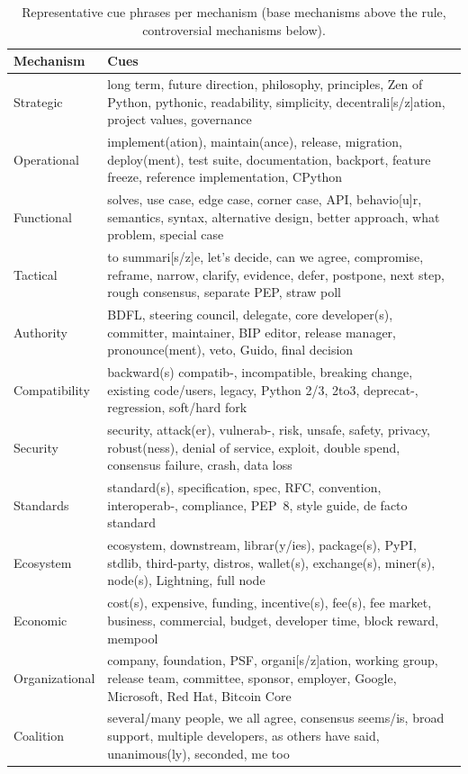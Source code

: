 \documentclass[sigconf,screen]{acmart}
\begin{document}
\begin{table}[t]
\caption{Representative cue phrases per mechanism (base mechanisms above the rule, controversial mechanisms below).}
\label{tab:cues}
\small
\begin{tabular}{p{}p{}}
\toprule
Mechanism & Cues \\
\midrule
Strategic & long term, future direction, philosophy, principles, Zen of Python, pythonic, readability, simplicity, decentrali[s/z]ation, project values, governance \\
Operational & implement(ation), maintain(ance), release, migration, deploy(ment), test suite, documentation, backport, feature freeze, reference implementation, CPython \\
Functional & solves, use case, edge case, corner case, API, behavio[u]r, semantics, syntax, alternative design, better approach, what problem, special case \\
Tactical & to summari[s/z]e, let's decide, can we agree, compromise, reframe, narrow, clarify, evidence, defer, postpone, next step, rough consensus, separate PEP, straw poll \\
Authority & BDFL, steering council, delegate, core developer(s), committer, maintainer, BIP editor, release manager, pronounce(ment), veto, Guido, final decision \\
Compatibility & backward(s) compatib-, incompatible, breaking change, existing code/users, legacy, Python 2/3, 2to3, deprecat-, regression, soft/hard fork \\
Security & security, attack(er), vulnerab-, risk, unsafe, safety, privacy, robust(ness), denial of service, exploit, double spend, consensus failure, crash, data loss \\
Standards & standard(s), specification, spec, RFC, convention, interoperab-, compliance, PEP~8, style guide, de facto standard \\
Ecosystem & ecosystem, downstream, librar(y/ies), package(s), PyPI, stdlib, third-party, distros, wallet(s), exchange(s), miner(s), node(s), Lightning, full node \\
Economic & cost(s), expensive, funding, incentive(s), fee(s), fee market, business, commercial, budget, developer time, block reward, mempool \\
Organizational & company, foundation, PSF, organi[s/z]ation, working group, release team, committee, sponsor, employer, Google, Microsoft, Red Hat, Bitcoin Core \\
Coalition & several/many people, we all agree, consensus seems/is, broad support, multiple developers, as others have said, unanimous(ly), seconded, me too \\

\end{tabular}
\end{table}
\end{document}
